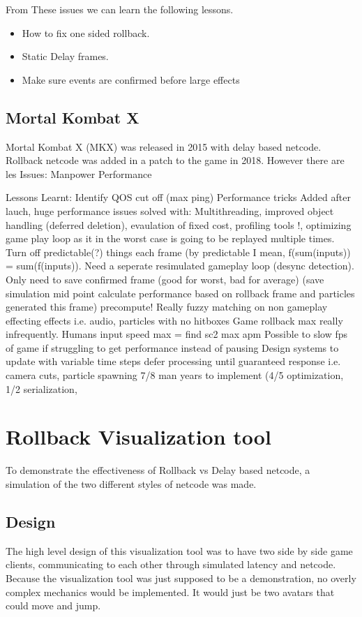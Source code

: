 \documentclass{entcs}
\begin{document}
From These issues we can learn the following lessons.
\begin{itemize}
\item How to fix one sided rollback.
\item Static Delay frames.
\item Make sure events are confirmed before large effects
\end{itemize}
\subsection{Mortal Kombat X}
Mortal Kombat X (MKX) was released in 2015 with delay based netcode. Rollback netcode was added in a patch to the game in 2018. However there are les
Issues:
Manpower
Performance

Lessons Learnt:
Identify QOS cut off (max ping)
Performance tricks  
Added after lauch, huge performance issues solved with:
Multithreading, improved object handling (deferred deletion), evaulation of fixed cost, profiling tools !, optimizing game play loop as it in the worst case is going to be replayed multiple times.
Turn off predictable(?) things each frame (by predictable I mean, f(sum(inputs)) = sum(f(inputs)).
Need a seperate resimulated gameplay loop (desync detection).
Only need to save confirmed frame (good for worst, bad for average) (save simulation mid point calculate performance based on rollback frame and particles generated this frame)
precompute!
Really fuzzy matching on non gameplay effecting effects i.e. audio, particles with no hitboxes
Game rollback max really infrequently. Humans input speed max = find sc2 max apm
Possible to slow fps of game if struggling to get performance instead of pausing
Design systems to update with variable time steps
defer processing until guaranteed response i.e. camera cuts, particle spawning
7/8 man years to implement (4/5 optimization, 1/2 serialization,


\section{Rollback Visualization tool}
To demonstrate the effectiveness of Rollback vs Delay based netcode, a simulation of the two different styles of netcode was made.
\subsection{Design}
The high level design of this visualization tool was to have two side by side game clients, communicating to each other through simulated latency and netcode. Because the visualization tool was just supposed to be a demonstration, no overly complex mechanics would be implemented. It would just be two avatars that could move and jump.
\end{document}
